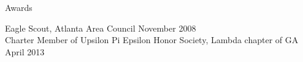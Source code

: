 \documentclass[11pt]{resume} %
\begin{document}

\begin{rSection}{Awards}

{Eagle Scout, Atlanta Area Council} \hfill November 2008\\
{Charter Member of Upsilon Pi Epsilon Honor Society, Lambda chapter of GA} \hfill April 2013 \\

\end{rSection}






\end{document}
